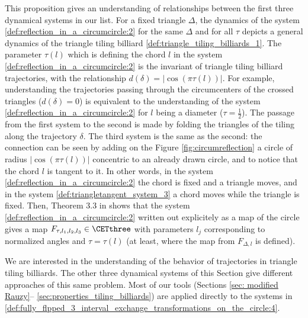 \documentclass[12pt]{article}
\theoremstyle{definition}
\begin{document}
This proposition gives an understanding of relationships between the first three dynamical systems in our list. For a fixed triangle $\Delta$, the dynamics of the system \ref{def:reflection_in_a_circumcircle:2} for the same $\Delta$ and for all $\tau$ depicts a general dynamics of the triangle tiling billiard \ref{def:triangle_tiling_billiards_1}. The parameter $\tau(l)$ which is defining the chord $l$ in the system \ref{def:reflection_in_a_circumcircle:2} is the invariant of triangle tiling billiard trajectories, with the relationship $d(\delta)=|\cos \left( \pi \tau(l) \right)\vert$. For example, understanding the trajectories passing through the circumcenters of the crossed triangles ($d(\delta)=0$) is equivalent to the understanding of the system \ref{def:reflection_in_a_circumcircle:2} for $l$ being a diameter ($\tau=\frac{1}{2}$). The passage from the first system to the second is made by folding the triangles of the tiling along the trajectory $\delta$.
The third system is the same as the second: the connection can be seen by adding on the Figure \ref{fig:circumreflection} a circle of radius $|\cos \left( \pi \tau(l) \right)\vert$ concentric to an already drawn circle, and to notice that the chord $l$ is tangent to it. In other words, in the system \ref{def:reflection_in_a_circumcircle:2} the chord is fixed and a triangle moves, and in the system \ref{def:triangletangent_system_3} a chord moves while the triangle is fixed. Then, Theorem 3.3 in \cite{BDFI18} shows that the system \ref{def:reflection_in_a_circumcircle:2} written out explicitely as a map of the circle gives a map $F_{\tau, l_1, l_2, l_3} \in \CETthree$ with parameters $l_j$ corresponding to normalized angles and $\tau=\tau(l)$ (at least, where the map from $F_{\Delta, l}$ is defined).

We are interested in the understanding of the behavior of trajectories in triangle tiling billiards. The other three dynamical systems of this Section give different approaches of this same problem. Most of our tools (Sections \ref{sec: modified Rauzy}-- \ref{sec:properties_tiling_billiards}) are applied directly to the systems in \ref{def:fully_flpped_3_interval_exchange_transformations_on_the_circle:4}. 
\end{document}
